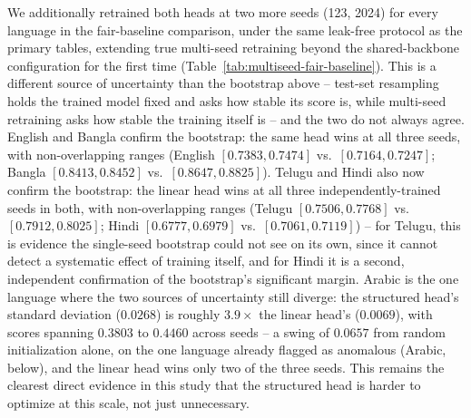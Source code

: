 \documentclass[manuscript]{acmart}
\begin{document}
We additionally retrained both heads at two more seeds (123, 2024) for every language in the fair-baseline comparison, under the same leak-free protocol as the primary tables, extending true multi-seed retraining beyond the shared-backbone configuration for the first time (Table~\ref{tab:multiseed-fair-baseline}). This is a different source of uncertainty than the bootstrap above -- test-set resampling holds the trained model fixed and asks how stable its score is, while multi-seed retraining asks how stable the training itself is -- and the two do not always agree. English and Bangla confirm the bootstrap: the same head wins at all three seeds, with non-overlapping ranges (English $[0.7383,0.7474]$ vs.\ $[0.7164,0.7247]$; Bangla $[0.8413,0.8452]$ vs.\ $[0.8647,0.8825]$). Telugu and Hindi also now confirm the bootstrap: the linear head wins at all three independently-trained seeds in both, with non-overlapping ranges (Telugu $[0.7506,0.7768]$ vs.\ $[0.7912,0.8025]$; Hindi $[0.6777,0.6979]$ vs.\ $[0.7061,0.7119]$) -- for Telugu, this is evidence the single-seed bootstrap could not see on its own, since it cannot detect a systematic effect of training itself, and for Hindi it is a second, independent confirmation of the bootstrap's significant margin. Arabic is the one language where the two sources of uncertainty still diverge: the structured head's standard deviation ($0.0268$) is roughly $3.9\times$ the linear head's ($0.0069$), with scores spanning $0.3803$ to $0.4460$ across seeds -- a swing of $0.0657$ from random initialization alone, on the one language already flagged as anomalous (Arabic, below), and the linear head wins only two of the three seeds. This remains the clearest direct evidence in this study that the structured head is harder to optimize at this scale, not just unnecessary.
\end{document}
